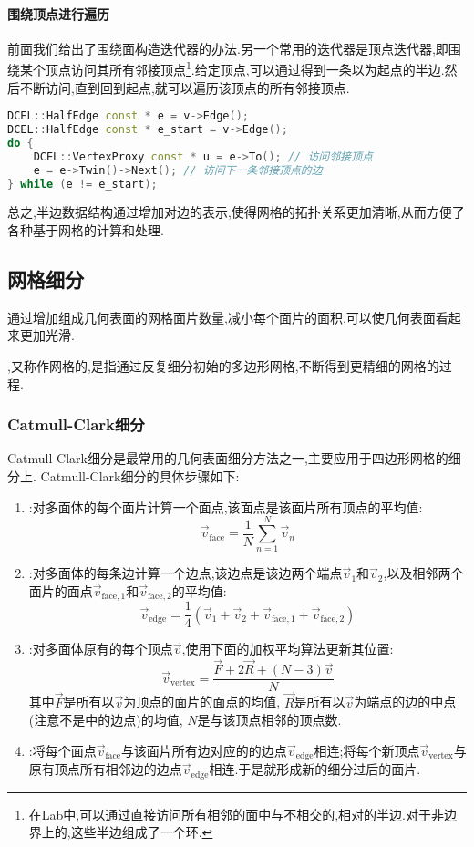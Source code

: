 \documentclass{ctexart}
\begin{document}
\paragraph{围绕顶点进行遍历}
前面我们给出了围绕面构造迭代器的办法.另一个常用的迭代器是顶点迭代器,即围绕某个顶点访问其所有邻接顶点\footnote{在Lab中,可以通过直接访问所有相邻的面中与不相交的,相对的半边.对于非边界上的,这些半边组成了一个环.}.给定顶点,可以通过得到一条以为起点的半边.然后不断访问,直到回到起点,就可以遍历该顶点的所有邻接顶点.
\begin{lstlisting}[language=C++]
DCEL::HalfEdge const * e = v->Edge();
DCEL::HalfEdge const * e_start = v->Edge();
do {
    DCEL::VertexProxy const * u = e->To(); // 访问邻接顶点
    e = e->Twin()->Next(); // 访问下一条邻接顶点的边
} while (e != e_start);
\end{lstlisting}
总之,半边数据结构通过增加对边的表示,使得网格的拓扑关系更加清晰,从而方便了各种基于网格的计算和处理.
\subsection{网格细分}
通过增加组成几何表面的网格面片数量,减小每个面片的面积,可以使几何表面看起来更加光滑.
\begin{definition}[网格细分]
    ,又称作网格的,是指通过反复细分初始的多边形网格,不断得到更精细的网格的过程.
\end{definition}
\subsubsection{Catmull-Clark细分}
Catmull-Clark细分是最常用的几何表面细分方法之一,主要应用于四边形网格的细分上. Catmull-Clark细分的具体步骤如下:
\begin{enumerate}[label=\tbf{\arabic*}.,topsep=0pt,parsep=0pt,itemsep=0pt,partopsep=0pt]
    \item {}:对多面体的每个面片计算一个面点,该面点是该面片所有顶点的平均值:
        \[\vec{v}_{\text{face}}=\dfrac{1}{N}\sum_{n=1}^{N}\vec{v}_n\]
    \item {}:对多面体的每条边计算一个边点,该边点是该边两个端点$\vec{v}_1$和$\vec{v}_2$,以及相邻两个面片的面点$\vec{v}_{\text{face},1}$和$\vec{v}_{\text{face},2}$的平均值:
        \[\vec{v}_{\text{edge}}=\dfrac{1}{4}\left(\vec{v}_1+\vec{v}_2+\vec{v}_{\text{face},1}+\vec{v}_{\text{face},2}\right)\]
    \item {}:对多面体原有的每个顶点$\vec{v}$,使用下面的加权平均算法更新其位置:
        \[\vec{v}_{\text{vertex}}=\dfrac{\vec{F}+2\vec{R}+(N-3)\vec{v}}{N}\]
        其中$\vec{F}$是所有以$\vec{v}$为顶点的面片的面点的均值, $\vec{R}$是所有以$\vec{v}$为端点的边的中点(注意不是中的边点)的均值, $N$是与该顶点相邻的顶点数.
    \item {}:将每个面点$\vec{v}_{\text{face}}$与该面片所有边对应的的边点$\vec{v}_{\text{edge}}$相连;将每个新顶点$\vec{v}_{\text{vertex}}$与原有顶点所有相邻边的边点$\vec{v}_{\text{edge}}$相连.于是就形成新的细分过后的面片.
\end{enumerate}
\end{document}
